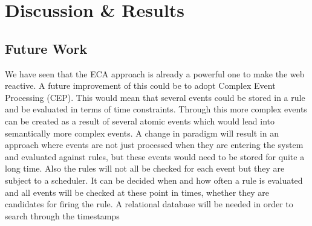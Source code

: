 
\chapter{Discussion \& Results}



%




\section{Future Work}
%
We have seen that the ECA approach is already a powerful one to make the web reactive.
A future improvement of this could be to adopt Complex Event Processing (CEP).
This would mean that several events could be stored in a rule and be evaluated in terms of time constraints.
Through this more complex events can be created as a result of several atomic events which would lead into semantically more complex events.
A change in paradigm will result in an approach where events are not just processed when they are entering the system and evaluated against rules, but these events would need to be stored for quite a long time.
Also the rules will not all be checked for each event but they are subject to a scheduler.
It can be decided when and how often a rule is evaluated and all events will be checked at these point in times, whether they are candidates for firing the rule.
A relational database will be needed in order to search through the timestamps